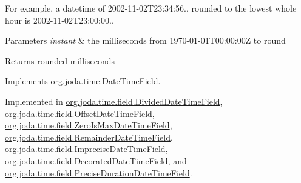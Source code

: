 For example, a datetime of 2002-\/11-\/02\-T23\-:34\-:56., rounded to the lowest whole hour is 2002-\/11-\/02\-T23\-:00\-:00..


\begin{DoxyParams}{Parameters}
{\em instant} & the milliseconds from 1970-\/01-\/01\-T00\-:00\-:00\-Z to round \\
\hline
\end{DoxyParams}
\begin{DoxyReturn}{Returns}
rounded milliseconds 
\end{DoxyReturn}


Implements \hyperlink{classorg_1_1joda_1_1time_1_1_date_time_field_a324fc5295f21a7777080a423d256604a}{org.\-joda.\-time.\-Date\-Time\-Field}.



Implemented in \hyperlink{classorg_1_1joda_1_1time_1_1field_1_1_divided_date_time_field_aa6797087fc15f87da79e732a664699e6}{org.\-joda.\-time.\-field.\-Divided\-Date\-Time\-Field}, \hyperlink{classorg_1_1joda_1_1time_1_1field_1_1_offset_date_time_field_af7e8fc6783ae94a1e11b9582a38160c9}{org.\-joda.\-time.\-field.\-Offset\-Date\-Time\-Field}, \hyperlink{classorg_1_1joda_1_1time_1_1field_1_1_zero_is_max_date_time_field_a036742db40169291705fe496604c5978}{org.\-joda.\-time.\-field.\-Zero\-Is\-Max\-Date\-Time\-Field}, \hyperlink{classorg_1_1joda_1_1time_1_1field_1_1_remainder_date_time_field_abb13f870c07e593a156e45f6797f8c61}{org.\-joda.\-time.\-field.\-Remainder\-Date\-Time\-Field}, \hyperlink{classorg_1_1joda_1_1time_1_1field_1_1_imprecise_date_time_field_a003f001fe5680f4a5f4cb2c61d4ad6d7}{org.\-joda.\-time.\-field.\-Imprecise\-Date\-Time\-Field}, \hyperlink{classorg_1_1joda_1_1time_1_1field_1_1_decorated_date_time_field_a900b454e29332973f15ce88e34774878}{org.\-joda.\-time.\-field.\-Decorated\-Date\-Time\-Field}, and \hyperlink{classorg_1_1joda_1_1time_1_1field_1_1_precise_duration_date_time_field_ad751284833564660913d259c7cfd3e48}{org.\-joda.\-time.\-field.\-Precise\-Duration\-Date\-Time\-Field}.

